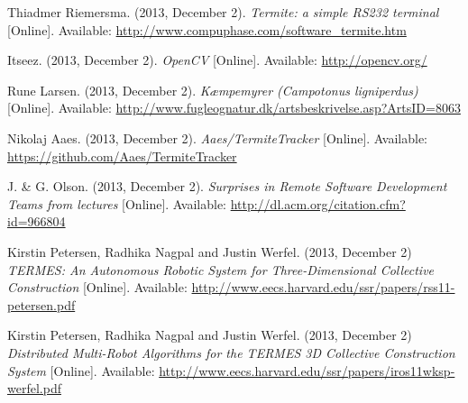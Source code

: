 \documentclass[oribibl]{llncs}
\begin{document}


\begin{thebibliography}{9}
    
		 Thiadmer Riemersma. (2013, December 2). \textit{Termite: a simple RS232 terminal} [Online]. Available: \url{http://www.compuphase.com/software_termite.htm}
        
         Itseez. (2013, December 2). \textit{OpenCV} [Online]. Available: \url{http://opencv.org/}
        
         Rune Larsen. (2013, December 2). \textit{Kæmpemyrer (Campotonus ligniperdus)} [Online]. Available: \url{http://www.fugleognatur.dk/artsbeskrivelse.asp?ArtsID=8063}
        
         Nikolaj Aaes. (2013, December 2). \textit{Aaes/TermiteTracker} [Online]. Available: \url{https://github.com/Aaes/TermiteTracker}
        
		 J. \& G. Olson. (2013, December 2). \textit{Surprises in Remote Software Development Teams from lectures} [Online]. Available: \url{http://dl.acm.org/citation.cfm?id=966804}
        
         Kirstin Petersen, Radhika Nagpal and Justin Werfel. (2013, December 2) \textit{TERMES: An Autonomous Robotic System for Three-Dimensional Collective Construction} [Online]. Available: \url{http://www.eecs.harvard.edu/ssr/papers/rss11-petersen.pdf}
        
         Kirstin Petersen, Radhika Nagpal and Justin Werfel. (2013, December 2) \textit{Distributed Multi-Robot Algorithms for the TERMES 3D Collective Construction System} [Online]. Available: \url{http://www.eecs.harvard.edu/ssr/papers/iros11wksp-werfel.pdf}
        
\end{thebibliography}


\end{document}
